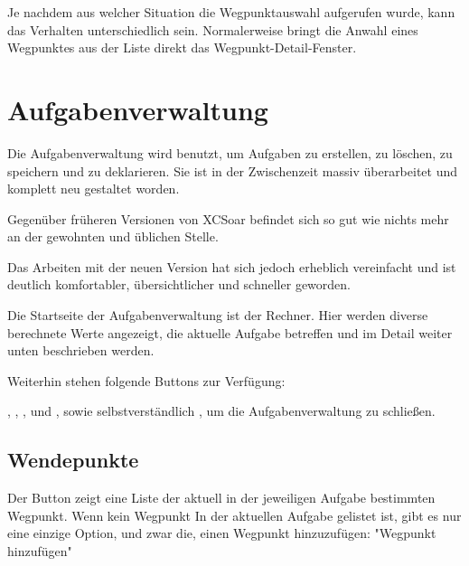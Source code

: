 Je nachdem aus welcher Situation die Wegpunktauswahl aufgerufen wurde, kann das Verhalten unterschiedlich sein. Normalerweise bringt die Anwahl eines Wegpunktes aus der Liste  direkt das Wegpunkt-Detail-Fenster.

\section{Aufgabenverwaltung }\label{sec:task-manager-dialog}
Die Aufgabenverwaltung wird benutzt, um Aufgaben zu erstellen, zu löschen, zu speichern und zu deklarieren. 
Sie ist in der Zwischenzeit massiv überarbeitet und komplett neu gestaltet worden.

Gegenüber früheren Versionen von \textsf{XCSoar} befindet sich so gut wie nichts mehr an der gewohnten und üblichen Stelle. 

Das Arbeiten mit der neuen Version hat sich jedoch erheblich vereinfacht und ist deutlich komfortabler, übersichtlicher und schneller geworden.

Die Startseite der Aufgabenverwaltung ist der Rechner. Hier werden diverse berechnete Werte angezeigt, die aktuelle Aufgabe betreffen und im Detail weiter unten beschrieben werden.

Weiterhin stehen folgende Buttons zur Verfügung:

  , , , und , sowie selbstverständlich , um die Aufgabenverwaltung zu schließen.

\subsection*{Wendepunkte}
Der Button   zeigt eine Liste der aktuell in der jeweiligen Aufgabe bestimmten Wegpunkt. Wenn kein Wegpunkt In der aktuellen Aufgabe gelistet ist, gibt es nur eine einzige Option, und zwar die, einen Wegpunkt hinzuzufügen: "Wegpunkt hinzufügen"

